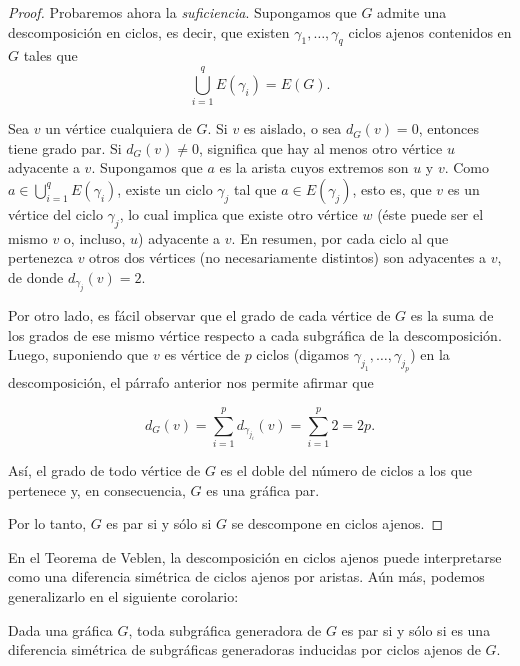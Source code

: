 \begin{proof}
Probaremos ahora la \textit{suficiencia}. Supongamos que $G$ admite una descomposición en ciclos, es decir, que existen $\gamma_{1}, \ldots, \gamma_{q}$ ciclos ajenos contenidos en $G$ tales que 
$$
\bigcup_{i=1}^{q} E(\gamma_{i}) = E(G).
$$

Sea $v$ un vértice cualquiera de $G$. Si $v$ es aislado, o sea $d_{G}(v)=0$, entonces tiene grado par. Si $d_{G}(v)\neq 0$, significa que hay al menos otro vértice $u$ adyacente a $v$. Supongamos que $a$ es la arista cuyos extremos son $u$ y $v$. Como $a \in \bigcup_{i=1}^{q} E(\gamma_{i})$, existe un ciclo $\gamma_{j}$ tal que $a \in E(\gamma_{j})$, esto es, que $v$ es un vértice del ciclo $\gamma_{j}$, lo cual implica que existe otro vértice $w$ (éste puede ser el mismo $v$ o, incluso, $u$) adyacente a $v$. En resumen, por cada ciclo al que pertenezca $v$ otros dos vértices (no necesariamente distintos) son adyacentes a $v$, de donde $d_{\gamma_{j}}(v) = 2$. 

Por otro lado, es fácil observar que el grado de cada vértice de $G$ es la suma de los grados de ese mismo vértice respecto a cada subgráfica de la descomposición. Luego, suponiendo que $v$ es vértice de $p$ ciclos (digamos $\gamma_{j_{1}}, \ldots, \gamma_{j_{p}}$) en la descomposición, el párrafo anterior nos permite afirmar que

$$
d_{G}(v) = \sum_{i=1}^{p}d_{\gamma_{j_{i}}}(v)=\sum_{i=1}^{p}2=2p.
$$

Así, el grado de todo vértice de $G$ es el doble del número de ciclos a los que pertenece y, en consecuencia, $G$ es una gráfica par. 

Por lo tanto, $G$ es par si y sólo si $G$ se descompone en ciclos ajenos.

\end{proof}


En el Teorema de Veblen, la descomposición en ciclos ajenos puede interpretarse como una diferencia simétrica de ciclos ajenos por aristas. Aún más, podemos generalizarlo en el siguiente corolario:

\begin{cor}\label{teo:veblen2}
Dada una gráfica $G$, toda subgráfica generadora de $G$ es par si y sólo si es una diferencia simétrica de subgráficas generadoras inducidas por ciclos ajenos de $G$.
 \end{cor}
 
